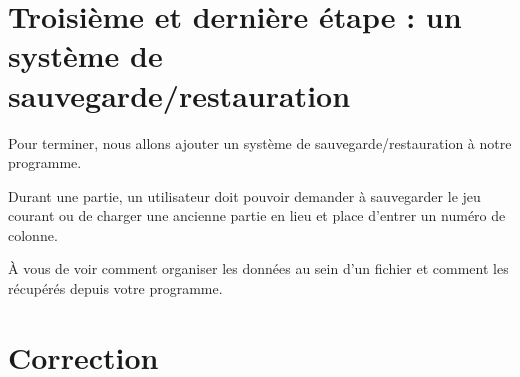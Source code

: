\section{Troisième et dernière étape : un système de sauvegarde/restauration}
\label{troisieme-et-derniere-etape-:-un-systeme-de-sauvegarde/restauration}

Pour terminer, nous allons ajouter un système de sauvegarde/restauration
à notre programme.

Durant une partie, un utilisateur doit pouvoir demander à sauvegarder le
jeu courant ou de charger une ancienne partie en lieu et place d'entrer
un numéro de colonne.

À vous de voir comment organiser les données au sein d'un fichier et
comment les récupérés depuis votre programme.


\section{Correction}
\label{correction-20}

